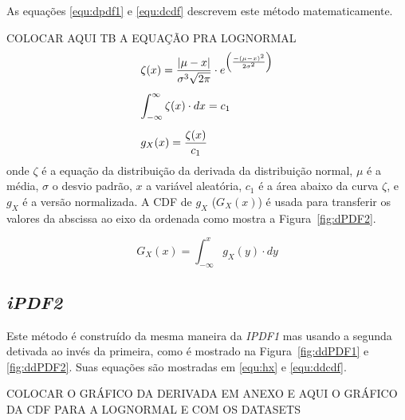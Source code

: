 As equações \eqref{equ:dpdf1} e \eqref{equ:dcdf} descrevem este método matematicamente.

\color{red} COLOCAR AQUI TB A EQUAÇÃO PRA LOGNORMAL \color{black}
\begin{equation}
\begin{array}{l}
\vspace{0.3cm}\displaystyle \zeta(x) = \frac{|\mu-x|}{\sigma^3\sqrt{2\pi}}\cdot e^{\left(\frac{-(\mu-x)^2}{2\sigma^2}\right) } \\
\vspace{0.3cm} \displaystyle \int_{-\infty}^{\infty} \zeta(x)\cdot dx = c_1 \\
\displaystyle g_X(x) = \frac{\zeta(x)}{c_1}
\label{equ:dpdf1}
\end{array}
\end{equation}
onde $\zeta$ é a equação da distribuição da derivada da distribuição normal, $\mu$ é a média, $\sigma$ o desvio padrão, $x$ a variável aleatória, $c_1$ é a área abaixo da curva $\zeta$, e $g_X$ é a versão normalizada.	
A \ac{CDF} de $g_X$ ($G_X(x)$) é usada para transferir os valores da abscissa ao eixo da ordenada como mostra a  Figura~\ref{fig:dPDF2}.

\begin{equation}
G_X(x) = \int_{-\infty}^x g_X(y)\cdot dy
\label{equ:dcdf}
\end{equation}

\subsection{\textit{iPDF2}}
Este método é construído da mesma maneira da \textit{IPDF1} mas usando a segunda detivada ao invés da primeira, como é mostrado na Figura~\ref{fig:ddPDF1} e \ref{fig:ddPDF2}. Suas equações são mostradas em \eqref{equ:hx} e \eqref{equ:ddcdf}.

{\color{red} COLOCAR O GRÁFICO DA DERIVADA EM ANEXO E AQUI O GRÁFICO DA CDF PARA A LOGNORMAL E COM OS DATASETS}

